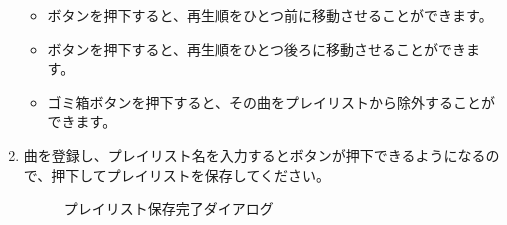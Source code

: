 \begin{enumerate}
                \begin{itemize}
                    \item {}ボタンを押下すると、再生順をひとつ前に移動させることができます。
                    \item {}ボタンを押下すると、再生順をひとつ後ろに移動させることができます。
                    \item ゴミ箱ボタンを押下すると、その曲をプレイリストから除外することができます。
                \end{itemize}

            \newpage
            \item 曲を登録し、プレイリスト名を入力するとボタンが押下できるようになるので、押下してプレイリストを保存してください。
                \begin{figure}[htbp]
                    \centering
                    \caption{プレイリスト保存完了ダイアログ}
                    \label{img:playlist6}
                \end{figure}


\end{enumerate}
